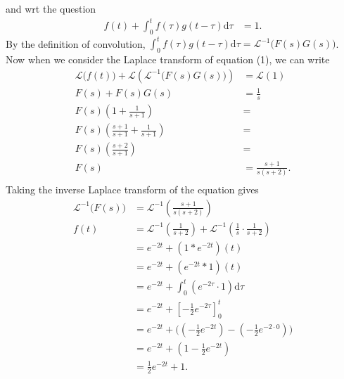 \documentclass[10pt]{article}
\newcommand*{\La}{\mathcal{L}}
\begin{document}
\begin{enumerate}
      and wrt the question
      \begin{align}
        f(t) + \int_0^tf(\tau)g(t  - \tau)\text{d}\tau &= 1.
      \end{align}
      By the definition of convolution,
      $\int_0^tf(\tau)g(t  - \tau)\text{d}\tau = \La^{-1}\big(F(s)G(s)\big)$.
      Now when we consider the Laplace transform of equation (1), we can write
      \begin{align*}
        \La\big(f(t)\big) + \La\left(\La^{-1}\big(F(s)G(s)\big)\right) &= \La(1) \\
        F(s) + F(s)G(s) &= \frac{1}{s} \\
        F(s)\left(1 + \frac{1}{s + 1}\right) &= \\
        F(s)\left(\frac{s + 1}{s + 1} + \frac{1}{s + 1}\right) &= \\
        F(s)\left(\frac{s + 2}{s + 1}\right) &= \\
        F(s) &= \frac{s + 1}{s(s + 2)}. \\
      \end{align*}
    Taking the inverse Laplace transform of the equation gives
      \begin{align*}
        \La^{-1}\big(F(s)\big) &= \La^{-1}\left(\frac{s + 1}{s(s + 2)}\right) \\
        f(t) &= \La^{-1}\left(\frac{1}{s + 2}\right) + \La^{-1}\left(\frac{1}{s}\cdot\frac{1}{s + 2}\right) \\
             &= e^{-2t} + (1 * e^{-2t})(t) \\
             &= e^{-2t} + (e^{-2t} * 1)(t) \\
             &= e^{-2t} + \int_0^t\left(e^{-2\tau} \cdot 1\right) \text{d}\tau \\
             &= e^{-2t} + \left[-\frac{1}{2}e^{-2\tau}\right]_0^t \\
             &= e^{-2t} + \Big(( - \frac{1}{2}e^{-2t}) - ( - \frac{1}{2}e^{-2 \cdot 0} ) \Big) \\
             &= e^{-2t} + ( 1 - \frac{1}{2}e^{-2t}) \\
             &= \frac{1}{2}e^{-2t} + 1. \\
      \end{align*}
  \end{enumerate}
\end{document}
